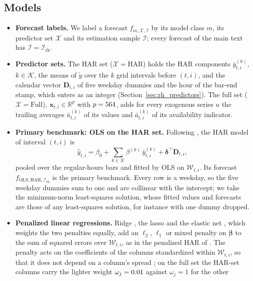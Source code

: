 \subsection{Models}
\label{sec:rh_methods_models}
\begin{itemize}
\item \textbf{Forecast labels.} We label a forecast $f_{m,\mathcal X,\mathcal I}$ by its model class $m$, its
  predictor set $\mathcal X$ and its estimation sample $\mathcal I$; every forecast of the main text has
  $\mathcal I = \mathcal I_{\mathrm{rh}}$.
\item \textbf{Predictor sets.} The HAR set ($\mathcal X = \mathrm{HAR}$) holds the HAR components
  $\bar y^{(k)}_{t,i}$, $k \in \mathcal K$, the means of $\tilde y$ over the $k$ grid intervals before $(t,i)$, and
  the calendar vector $\bm D_{t,i}$ of five weekday dummies and the hour of the bar-end stamp, which enters as an
  integer (Section~\ref{sec:rh_predictors}). The full set ($\mathcal X = \mathrm{Full}$),
  $\bm x_{t,i} \in \mathbb R^{p}$ with $p = 564$, adds for every exogenous series $u$ the trailing averages
  $\bar u^{(k)}_{t,i}$ of its values and $\bar a^{(k)}_{t,i}$ of its availability indicator.
\item \textbf{Primary benchmark: OLS on the HAR set.} Following \citet{Corsi2009}, the HAR model of interval $(t,i)$ is
  \[
    \hat y_{t,i} = \beta_0 + \sum_{k \in \mathcal K} \beta^{(k)}\, \bar y^{(k)}_{t,i} + \bm\delta^{\top} \bm D_{t,i} ,
  \]
  pooled over the regular-hours bars and fitted by OLS on $\mathcal W_{t,i}$. Its forecast
  $f_{\mathrm{OLS},\mathrm{HAR},\mathcal I_{\mathrm{rh}}}$ is the primary benchmark. Every row is a weekday, so the
  five weekday dummies sum to one and are collinear with the intercept; we take the minimum-norm least-squares
  solution, whose fitted values and forecasts are those of any least-squares solution, for instance with one dummy
  dropped.
\item \textbf{Penalized linear regressions.} Ridge \citep{HoerlKennard1970}, the lasso \citep{Tibshirani1996} and the
  elastic net \citep{ZouHastie2005}, which weights the two penalties equally, add an $\ell_2$, $\ell_1$ or mixed
  penalty on $\bm\beta$ to the sum of squared errors over $\mathcal W_{t,i}$, as in the penalized HAR of
  \citet{ZhangZhangCucuringuQian2024}. The penalty acts on the coefficients of the columns standardized within
  $\mathcal W_{t,i}$, so that it does not depend on a column's spread \citep{FriedmanHastieTibshirani2010}; on the full
  set the HAR-set columns carry the lighter weight $\omega_j = 0.01$ against $\omega_j = 1$ for the other

\end{itemize}
